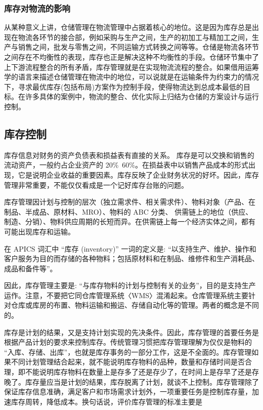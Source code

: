 \subsubsection { 库存对物流的影响}

    从某种意义上讲，仓储管理在物流管理中占据着核心的地位。这是因为库存总是出现在物流各环节的接合部，例如采购与生产之间，生产的初加工与精加工之间，生产与销售之间，批发与零售之间，不同运输方式转换之间等等。仓储是物流各环节之间存在不均衡性的表现，库存也正是解决这种不均衡性的手段。仓储环节集中了上下游流程整合的所有矛盾，库存管理就是在实现物流流程的整合。如果借用运筹学的语言来描述仓储管理在物流中的地位，可以说就是在运输条件为约束力的情况下，寻求最优库存(包括布局)方案作为控制手段，使得物流达到总成本最低的目标。在许多具体的案例中，物流的整合、优化实际上归结为仓储的方案设计与运行控制。

\subsection {库存控制}

    库存信息对财务的资产负债表和损益表有直接的关系。 库存是可以交换和销售的流动资产，一般约占企业资产的 20\%~60\%。在损益表中以销售产品成本的形式出现，它是说明企业收益的重要因素。库存反映了企业财务状况的好坏。因此，库存管理非常重要，不能仅仅看成是一个记好库存台账的问题。

    库存管理因计划与控制的层次（独立需求件、相关需求件）、物料对象（产品、在制品、半成品、原材料、MRO）、物料的 ABC 分类、 供需链上的地位（供应、制造、分销）、物料供应周期的长短而异。在供需链上每一个经济实体之间，都有可能出现库存和运输。

    在 APICS 词汇中 “库存 (inventory)” 一词的定义是: “以支持生产、维护、操作和客户服务为目的而存储的各种物料；包括原材料和在制品、维修件和生产消耗品、成品和备件等”。

    因此，库存管理主要是: “与库存物料的计划与控制有关的业务”，目的是支持生产运作。注意，不要把它同仓库管理系统〈WMS〉混淆起来。仓库管理系统主要针对仓库或库房的布置、物料运输和搬运、存储自动化等的管理。两者的概念是不同的。

    库存是计划的结果，又是支持计划实现的先决条件。因此，库存管理的首要任务是根据产品计划的要求来控制库存。传统管理习惯把库存管理理解为仅仅是物料的 “入库、存储、出库”，也就是库存事务的一部分工作，这是不全面的。库存管理如果不同计划管理结合起来，就不能说明库存物料的品种，数量和存储时间是否合理，即不能说明库存物料在数量上是存多了还是存少了，在时间上是存早了还是存晚了。库存量应当是计划的结果，库存脱离了计划，就谈不上控制。库存管理除了保证库存信息准确，满足客户和市场需求计划外，一项重要任务是控制库存量，加速库存周转，降低成本。换句话说，评价库存管理的标准主要是

